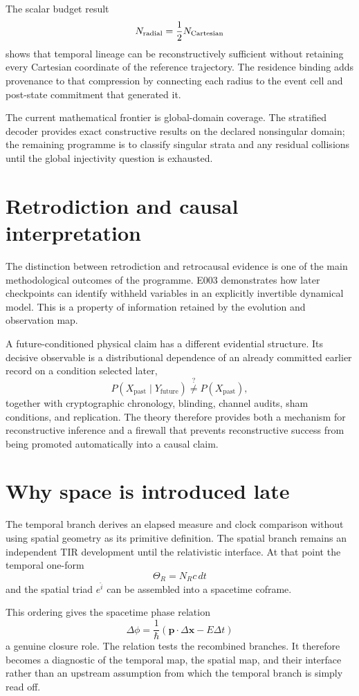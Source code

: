The scalar budget result
\[
N_{\rm radial}=\frac12N_{\rm Cartesian}
\]
shows that temporal lineage can be reconstructively sufficient without retaining every Cartesian coordinate of the reference trajectory. The residence binding adds provenance to that compression by connecting each radius to the event cell and post-state commitment that generated it.

The current mathematical frontier is global-domain coverage. The stratified decoder provides exact constructive results on the declared nonsingular domain; the remaining programme is to classify singular strata and any residual collisions until the global injectivity question is exhausted.

\section{Retrodiction and causal interpretation}

The distinction between retrodiction and retrocausal evidence is one of the main methodological outcomes of the programme. E003 demonstrates how later checkpoints can identify withheld variables in an explicitly invertible dynamical model. This is a property of information retained by the evolution and observation map.

A future-conditioned physical claim has a different evidential structure. Its decisive observable is a distributional dependence of an already committed earlier record on a condition selected later,
\[
P(X_{\mathrm{past}}\mid Y_{\mathrm{future}})
\stackrel{?}{\neq}
P(X_{\mathrm{past}}),
\]
together with cryptographic chronology, blinding, channel audits, sham conditions, and replication. The theory therefore provides both a mechanism for reconstructive inference and a firewall that prevents reconstructive success from being promoted automatically into a causal claim.

\section{Why space is introduced late}

The temporal branch derives an elapsed measure and clock comparison without using spatial geometry as its primitive definition. The spatial branch remains an independent TIR development until the relativistic interface. At that point the temporal one-form
\[
\Theta_R=N_Rc\,dt
\]
and the spatial triad \(e^{\hat i}\) can be assembled into a spacetime coframe.

This ordering gives the spacetime phase relation
\[
\Delta\phi
=
\frac{1}{\hbar}
(\mathbf p\cdot\Delta\mathbf x-E\Delta t)
\]
a genuine closure role. The relation tests the recombined branches. It therefore becomes a diagnostic of the temporal map, the spatial map, and their interface rather than an upstream assumption from which the temporal branch is simply read off.


